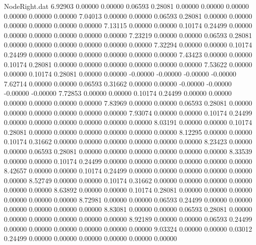 \begin{filecontents}{NodeRight.dat}
   6.92903    0.00000    0.00000     0.06593    0.28081    0.00000    0.00000    0.00000    0.00000    0.00000    0.00000
   7.04013    0.00000    0.00000     0.06593    0.28081    0.00000    0.00000    0.00000    0.00000    0.00000    0.00000
   7.13115    0.00000    0.00000     0.10174    0.24499    0.00000    0.00000    0.00000    0.00000    0.00000    0.00000
   7.23219    0.00000    0.00000     0.06593    0.28081    0.00000    0.00000    0.00000    0.00000    0.00000    0.00000
   7.32294    0.00000    0.00000     0.10174    0.24499    0.00000    0.00000    0.00000    0.00000    0.00000    0.00000
   7.43423    0.00000    0.00000     0.10174    0.28081    0.00000    0.00000    0.00000    0.00000    0.00000    0.00000
   7.53622    0.00000    0.00000     0.10174    0.28081    0.00000    0.00000   -0.00000   -0.00000   -0.00000   -0.00000
   7.62714    0.00000    0.00000     0.06593    0.31662    0.00000    0.00000   -0.00000   -0.00000   -0.00000   -0.00000
   7.72853    0.00000    0.00000     0.10174    0.24499    0.00000    0.00000    0.00000    0.00000    0.00000    0.00000
   7.83969    0.00000    0.00000     0.06593    0.28081    0.00000    0.00000    0.00000    0.00000    0.00000    0.00000
   7.93074    0.00000    0.00000     0.10174    0.24499    0.00000    0.00000    0.00000    0.00000    0.00000    0.00000
   8.03191    0.00000    0.00000     0.10174    0.28081    0.00000    0.00000    0.00000    0.00000    0.00000    0.00000
   8.12295    0.00000    0.00000     0.10174    0.31662    0.00000    0.00000    0.00000    0.00000    0.00000    0.00000
   8.23423    0.00000    0.00000     0.06593    0.28081    0.00000    0.00000    0.00000    0.00000    0.00000    0.00000
   8.33539    0.00000    0.00000     0.10174    0.24499    0.00000    0.00000    0.00000    0.00000    0.00000    0.00000
   8.42657    0.00000    0.00000     0.10174    0.24499    0.00000    0.00000    0.00000    0.00000    0.00000    0.00000
   8.52749    0.00000    0.00000     0.10174    0.31662    0.00000    0.00000    0.00000    0.00000    0.00000    0.00000
   8.63892    0.00000    0.00000     0.10174    0.28081    0.00000    0.00000    0.00000    0.00000    0.00000    0.00000
   8.72981    0.00000    0.00000     0.06593    0.24499    0.00000    0.00000    0.00000    0.00000    0.00000    0.00000
   8.83081    0.00000    0.00000     0.06593    0.28081    0.00000    0.00000    0.00000    0.00000    0.00000    0.00000
   8.92189    0.00000    0.00000     0.06593    0.24499    0.00000    0.00000    0.00000    0.00000    0.00000    0.00000
   9.03324    0.00000    0.00000     0.03012    0.24499    0.00000    0.00000    0.00000    0.00000    0.00000    0.00000

\end{filecontents}
